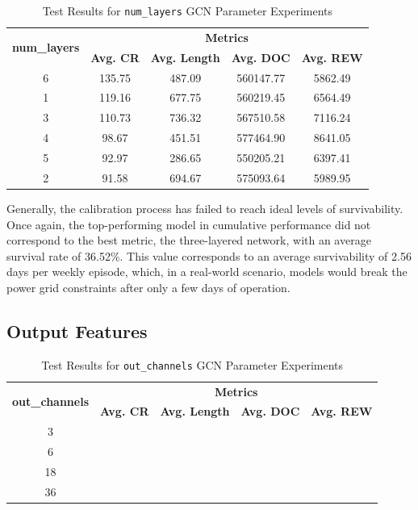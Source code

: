   \begin{table}[h!]
	\centering
	\caption{Test Results for \texttt{num\_layers} \ac{GCN} Parameter Experiments}
	\begin{tabular}{ccccc}
		\toprule
		\multirow{2}{*}{\textbf{num\_layers}} & \multicolumn{4}{c}{\textbf{Metrics}} \\ 
		\cmidrule(lr){2-5}
		&  \textbf{Avg. CR} & \textbf{Avg. Length} & \textbf{Avg. DOC} & \textbf{Avg. REW} \\ 
		\midrule
		
		6 & 135.75 & 487.09 & 560147.77 & 5862.49 \\
		1 & 119.16 & 677.75 & 560219.45 & 6564.49 \\
		3 & 110.73 & 736.32 & 567510.58 & 7116.24 \\
		4 & 98.67 & 451.51 & 577464.90 & 8641.05 \\
		5 & 92.97 & 286.65 & 550205.21 & 6397.41 \\
		2 & 91.58 & 694.67 & 575093.64 & 5989.95 \\
		\bottomrule
	\end{tabular}
	\label{tab:test-layers}
\end{table}

Generally, the calibration process has failed to reach ideal levels of survivability.
Once again, the top-performing model in cumulative performance did not correspond to the best metric, the three-layered network, with an average survival rate of 36.52\%. This value corresponds to an average survivability of 2.56 days per weekly episode, which, in a real-world scenario, models would break the power grid constraints after only a few days of operation. 

\subsection{Output Features} \label{sec:results-out}
 
  \begin{table}[h!]
	\centering
	\caption{Test Results for \texttt{out\_channels} \ac{GCN} Parameter Experiments}
	\begin{tabular}{ccccc}
		\toprule
		\multirow{2}{*}{\textbf{out\_channels}} & \multicolumn{4}{c}{\textbf{Metrics}} \\ 
		\cmidrule(lr){2-5}
		&  \textbf{Avg. CR} & \textbf{Avg. Length} & \textbf{Avg. DOC} & \textbf{Avg. REW} \\ 
		\midrule
		3 & & & & \\
		6 & & & & \\
		18 & & & & \\
		36 & & & & \\
		\bottomrule
	\end{tabular}
	\label{tab:test-gcn-out}
\end{table}

